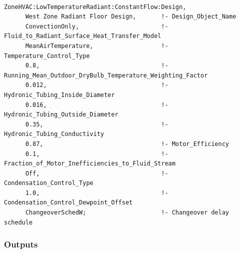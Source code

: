 \begin{lstlisting}

ZoneHVAC:LowTemperatureRadiant:ConstantFlow:Design,
      West Zone Radiant Floor Design,       !- Design_Object_Name
      ConvectionOnly,                       !- Fluid_to_Radiant_Surface_Heat_Transfer_Model
      MeanAirTemperature,                   !- Temperature_Control_Type
      0.8,                                  !- Running_Mean_Outdoor_DryBulb_Temperature_Weighting_Factor
      0.012,                                !- Hydronic_Tubing_Inside_Diameter
      0.016,                                !- Hydronic_Tubing_Outside_Diameter
      0.35,                                 !- Hydronic_Tubing_Conductivity
      0.87,                                 !- Motor_Efficiency
      0.1,                                  !- Fraction_of_Motor_Inefficiencies_to_Fluid_Stream
      Off,                                  !- Condensation_Control_Type
      1.0,                                  !- Condensation_Control_Dewpoint_Offset
      ChangeoverSchedW;                     !- Changeover delay schedule
\end{lstlisting}

\subsubsection{Outputs}\label{outputs-6-007}

